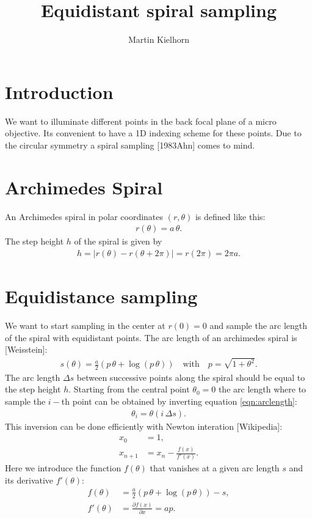 \documentclass[twocolumn,DIV18]{scrartcl}
\newcommand{\abs}[1]{\lvert #1 \rvert}
\renewcommand{\(}{\left(}
\renewcommand{\)}{\right)}
\begin{document}
\title{Equidistant spiral sampling}
\author{Martin Kielhorn}
\maketitle
\section{Introduction}
We want to illuminate different points in the back focal plane of a
micro objective. Its convenient to have a 1D indexing scheme for these
points. Due to the circular symmetry a spiral sampling [1983Ahn] comes
to mind. 

\section{Archimedes Spiral}
An Archimedes spiral in polar coordinates $(r,\theta)$ is defined like
this:
\begin{align}
  r(\theta)=a\,\theta.
\end{align}
The step height $h$ of the spiral is given by
\begin{align}
  h=\abs{r(\theta)-r(\theta+2\pi)}=r(2\pi)=2\pi a.
\end{align}
\section{Equidistance sampling}
We want to start sampling in the center at $r(0)=0$ and sample the arc
length of the spiral with equidistant points. The arc length of an
archimedes spiral is [Weisstein]:
\begin{align} \label{eqn:arclength}
  s(\theta)=\frac{a}{2}\(p\,\theta + \log(p\,\theta)\)\quad\textrm{with}\quad
  p=\sqrt{1+\theta^2}.
\end{align}
The arc length $\Delta s$ between successive points along the spiral
should be equal to the step height $h$. Starting from the central
point $\theta_0=0$ the arc length where to sample the $i-$th point can
be obtained by inverting equation \eqref{eqn:arclength}:
\begin{align}
  \theta_i=\theta(i\,\Delta s).
\end{align}
This inversion can be done efficiently with Newton interation
[Wikipedia]:
\begin{align}
  x_0&=1,\\
  x_{n+1}&=x_n-\frac{f(x)}{f'(x)}.
\end{align}
Here we introduce the function $f(\theta)$ that vanishes at a given arc
length $s$ and its derivative $f'(\theta)$:
\begin{align}
  \label{eqn:f}
  f(\theta)&=\frac{a}{2}\(p\,\theta+\log(p\,\theta)\)-s,\\
  f'(\theta)&=\frac{\partial f(x)}{\partial x}=a p.
\end{align}
\end{document}
